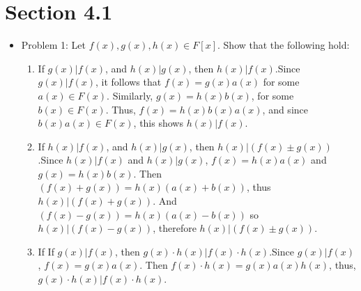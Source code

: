 \documentclass[hidelinks,12pt]{article}
\title{\scalebox{2}{Math 531 Homework 8}}
\author{\scalebox{1.5}{Theo Koss}}
\date{April 2021}
\begin{document}
\maketitle
\section{Section 4.1}
\begin{itemize}
    \item Problem 1: Let $f\left(x\right),g\left(x\right),h\left(x\right)\in F[x]$. Show that the following hold:\begin{enumerate}[label=(\alph*)]
        \item If $g\left(x\right)|f\left(x\right)$, and $h\left(x\right)|g\left(x\right)$, then $h\left(x\right)|f\left(x\right)$.\newline Since $g\left(x\right)|f\left(x\right)$, it follows that $f\left(x\right)=g\left(x\right)a\left(x\right)$ for some $a\left(x\right)\in F\left(x\right)$. Similarly, $g\left(x\right)=h\left(x\right)b\left(x\right)$, for some $b\left(x\right)\in F\left(x\right)$. Thus, $f\left(x\right)=h\left(x\right)b\left(x\right)a\left(x\right)$, and since $b\left(x\right)a\left(x\right)\in F\left(x\right)$, this shows $h\left(x\right)|f\left(x\right)$.
        \item If $h\left(x\right)|f\left(x\right)$, and $h\left(x\right)|g\left(x\right)$, then $h\left(x\right)|\left(f\left(x\right)\pm g\left(x\right)\right)$.\newline Since $h\left(x\right)|f\left(x\right)$ and $h\left(x\right)|g\left(x\right)$, $f\left(x\right)=h\left(x\right)a\left(x\right)$ and $g\left(x\right)=h\left(x\right)b\left(x\right)$. Then $\left(f\left(x\right)+g\left(x\right)\right)=h\left(x\right)\left(a\left(x\right)+b\left(x\right)\right)$, thus $h\left(x\right)|\left(f\left(x\right)+ g\left(x\right)\right)$. And $\left(f\left(x\right)-g\left(x\right)\right)=h\left(x\right)\left(a\left(x\right)-b\left(x\right)\right)$ so $h\left(x\right)|\left(f\left(x\right)-g\left(x\right)\right)$, therefore $h\left(x\right)|\left(f\left(x\right)\pm g\left(x\right)\right)$.
        \item If If $g\left(x\right)|f\left(x\right)$, then $g\left(x\right)\cdot h\left(x\right)|f\left(x\right)\cdot h\left(x\right)$.\newline Since $g\left(x\right)|f\left(x\right)$, $f\left(x\right)=g\left(x\right)a\left(x\right)$. Then $f\left(x\right)\cdot h\left(x\right)=g\left(x\right)a\left(x\right)h\left(x\right)$, thus, $g\left(x\right)\cdot h\left(x\right)|f\left(x\right)\cdot h\left(x\right)$.

\end{enumerate}
\end{itemize}
\end{document}
